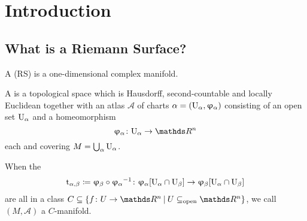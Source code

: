 \chapter{Introduction}

\section{What is a Riemann Surface?}

\begin{defi}
	A  (RS) is a one-dimensional complex manifold.

	A  is a topological space
	which is Hausdorff, second-countable and locally Euclidean
	together with an atlas \(\mathcal A\)
	of charts \(\alpha = (\textup{U}_{\alpha}, \upvarphi_{\alpha})\)
	consisting of an open set \(\textup{U}_{\alpha}\)
	and a homeomorphism
	\[\uphi\alpha\colon \U\alpha \to \R^n\]
	each and
	covering \(M = \bigcup_\alpha \textup{U}_{\alpha}\).

	When the 
	\begin{align*}
		\textup{t}_{\alpha, \beta}
		\coloneqq \upvarphi_{\beta}\circ{\upvarphi_{\alpha}}^{-1}
		\colon
		    \upvarphi_{\alpha}[\textup{U}_{\alpha}\cap\textup{U}_{\beta}]
	        \to \upvarphi_{\beta} [\textup{U}_{\alpha}\cap\textup{U}_{\beta}]
	\end{align*}
	are all in a class
	\(C \subseteq \{f\colon U \to \R^n \:\vert\: U \subsetopen \R^n\}\),
	we call \((M, \mathcal A)\) a \(C\)-manifold.
\end{defi}
